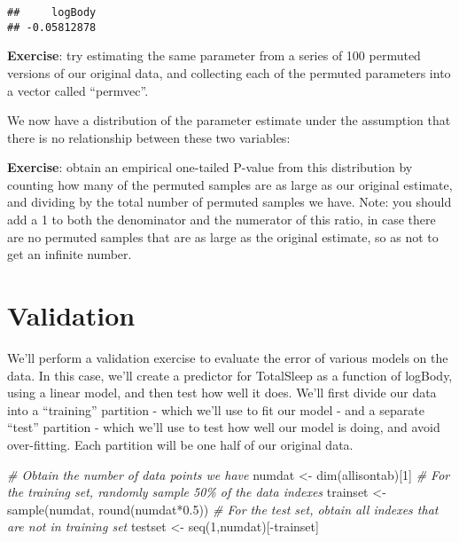 \documentclass[
]{book}
\newenvironment{Shaded}{\begin{snugshade}}{\end{snugshade}}
\newcommand{\AttributeTok}[1]{\textcolor[rgb]{0.77,0.63,0.00}{#1}}
\newcommand{\CommentTok}[1]{\textcolor[rgb]{0.56,0.35,0.01}{\textit{#1}}}
\newcommand{\DecValTok}[1]{\textcolor[rgb]{0.00,0.00,0.81}{#1}}
\newcommand{\FloatTok}[1]{\textcolor[rgb]{0.00,0.00,0.81}{#1}}
\newcommand{\FunctionTok}[1]{\textcolor[rgb]{0.00,0.00,0.00}{#1}}
\newcommand{\NormalTok}[1]{#1}
\newcommand{\OtherTok}[1]{\textcolor[rgb]{0.56,0.35,0.01}{#1}}
\newcommand{\SpecialCharTok}[1]{\textcolor[rgb]{0.00,0.00,0.00}{#1}}
\begin{document}
\begin{Shaded}
\end{Shaded}

\begin{verbatim}
##     logBody 
## -0.05812878
\end{verbatim}

\textbf{Exercise}: try estimating the same parameter from a series of 100 permuted versions of our original data, and collecting each of the permuted parameters into a vector called ``permvec''.

We now have a distribution of the parameter estimate under the assumption that there is no relationship between these two variables:

\textbf{Exercise}: obtain an empirical one-tailed P-value from this distribution by counting how many of the permuted samples are as large as our original estimate, and dividing by the total number of permuted samples we have. Note: you should add a 1 to both the denominator and the numerator of this ratio, in case there are no permuted samples that are as large as the original estimate, so as not to get an infinite number.

\hypertarget{validation}{%
\section{Validation}\label{validation}}

We'll perform a validation exercise to evaluate the error of various models on the data. In this case, we'll create a predictor for TotalSleep as a function of logBody, using a linear model, and then test how well it does. We'll first divide our data into a ``training'' partition - which we'll use to fit our model - and a separate ``test'' partition - which we'll use to test how well our model is doing, and avoid over-fitting. Each partition will be one half of our original data.

\begin{Shaded}
\begin{Highlighting}[]
\CommentTok{\# Obtain the number of data points we have}
\NormalTok{numdat }\OtherTok{\textless{}{-}} \FunctionTok{dim}\NormalTok{(allisontab)[}\DecValTok{1}\NormalTok{]}
\CommentTok{\# For the training set, randomly sample 50\% of the data indexes}
\NormalTok{trainset }\OtherTok{\textless{}{-}} \FunctionTok{sample}\NormalTok{(numdat, }\FunctionTok{round}\NormalTok{(numdat}\SpecialCharTok{*}\FloatTok{0.5}\NormalTok{))}
\CommentTok{\# For the test set, obtain all indexes that are not in training set}
\NormalTok{testset }\OtherTok{\textless{}{-}} \FunctionTok{seq}\NormalTok{(}\DecValTok{1}\NormalTok{,numdat)[}\SpecialCharTok{{-}}\NormalTok{trainset]}
\end{Highlighting}
\end{Shaded}
\end{document}
